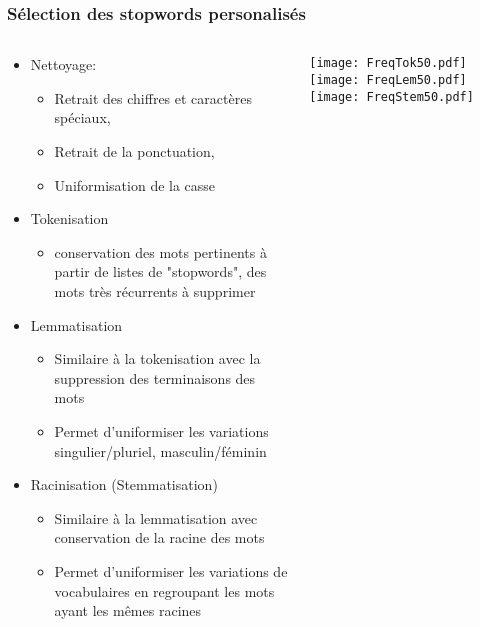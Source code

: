 \documentclass[8pt,aspectratio=169,hyperref={unicode=true}]{beamer}
\begin{document}
\subsubsection{Sélection des stopwords personalisés}
\begin{frame}{\insertsubsection}{\insertsubsubsection}
    \begin{columns}
        \begin{column}{.4\textwidth}
            \begin{itemize}
                \item Nettoyage:
                      \begin{itemize}
                          \item Retrait des chiffres et caractères spéciaux,
                          \item Retrait de la ponctuation,
                          \item Uniformisation de la casse
                      \end{itemize}
                \item Tokenisation
                      \begin{itemize}
                          \item conservation des mots pertinents à partir de listes de "stopwords", des mots très récurrents à supprimer
                      \end{itemize}
                \item Lemmatisation
                      \begin{itemize}
                          \item Similaire à la tokenisation avec la suppression des terminaisons des mots
                          \item Permet d'uniformiser les variations singulier/pluriel, masculin/féminin
                      \end{itemize}
                \item Racinisation (Stemmatisation)
                      \begin{itemize}
                          \item Similaire à la lemmatisation avec conservation de la racine des mots
                          \item Permet d'uniformiser les variations de vocabulaires en regroupant les mots ayant les mêmes racines
                      \end{itemize}
            \end{itemize}
        \end{column}
        \begin{column}{.6\textwidth}
            \texttt{[image: FreqTok50.pdf]}
            \texttt{[image: FreqLem50.pdf]}
            \texttt{[image: FreqStem50.pdf]}
        \end{column}
    \end{columns}
\end{frame}
\end{document}
